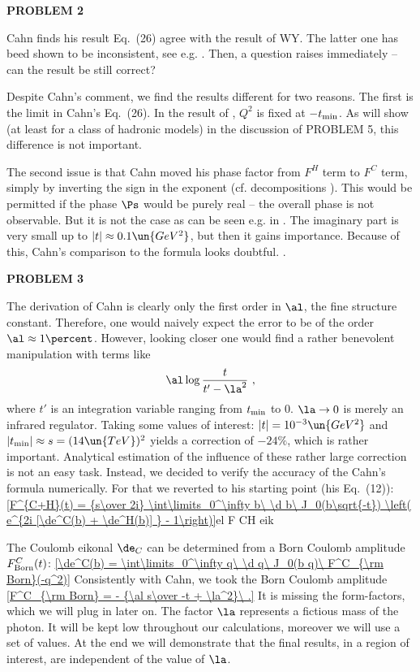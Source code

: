 

{\bf PROBLEM 2}

Cahn finds his result Eq.~(26) agree with the result of WY. The latter one has beed shown to be inconsistent, see e.g. . Then, a question raises immediately -- can the result be still correct?

Despite Cahn's comment, we find the results different for two reasons. The first is the limit in Cahn's Eq.~(26). In the result of \WaY{}, $Q^2$ is fixed at $-t_{\rm min}$. As will show (at least for a class of hadronic models) in the discussion of PROBLEM 5, this difference is not important.

The second issue is that Cahn moved his phase factor from $F^H$ term to $F^C$ term, simply by inverting the sign in the exponent (cf. decompositions ). This would be permitted if the phase $\Ps$ would be purely real -- the overall phase is not observable. But it is not the case as can be seen e.g. in . The imaginary part is very small up to $|t|\approx 0.1\un{GeV^2}$, but then it gains importance. Because of this, Cahn's comparison to the \WY{} formula looks doubtful. .

{\bf PROBLEM 3}

The derivation of Cahn  is clearly only the first order in $\al$, the fine structure constant. Therefore, one would naively expect the error to be of the order $\al\approx 1\percent$. However, looking closer one would find a rather benevolent manipulation with terms like
$$\al \log {t\over t' - \la^2}\ ,$$
where $t'$ is an integration variable ranging from $t_{\rm min}$ to $0$. $\la\to0$ is merely an infrared regulator. Taking some values of interest: $|t| = 10^{-3}\un{GeV^2}$ and $|t_{\rm min}| \approx s = (14\un{TeV})^2$ yields a correction of $-24\percent$, which is rather important. Analytical estimation of the influence of these rather large correction is not an easy task. Instead, we decided to verify the accuracy of the Cahn's formula numerically. For that we reverted to his starting point (his Eq.~(12)):
\eqref{F^{C+H}(t) = {s\over 2i} \int\limits_0^\infty b\ \d b\ J_0(b\sqrt{-t}) \left( e^{2i [\de^C(b) + \de^H(b)] } - 1\right)}{el F CH eik}

The Coulomb eikonal $\de_C$ can be determined from a Born Coulomb amplitude $F^C_{\rm Born}(t)$:
\eqref{\de^C(b) = \int\limits_0^\infty q\ \d q\ J_0(b q)\ F^C_{\rm Born}(-q^2)}{}
Consistently with Cahn, we took the Born Coulomb amplitude
\eqref{F^C_{\rm Born} = - {\al s\over -t + \la^2}\ .}{}
It is missing the form-factors, which we will plug in later on. The factor $\la$ represents a fictious mass of the photon. It will be kept low throughout our calculations, moreover we will use a set of values. At the end we will demonstrate that the final results, in a region of interest, are independent of the value of $\la$.

